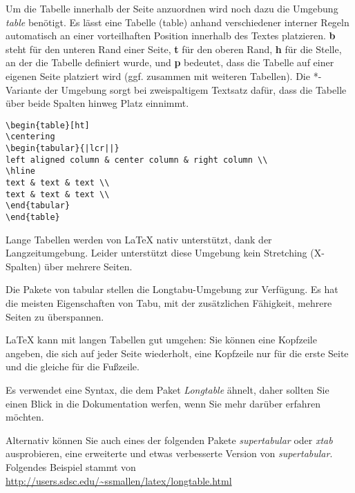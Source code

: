 \bigskip

Um die Tabelle innerhalb der Seite anzuordnen wird noch dazu die Umgebung \emph{table} benötigt. Es lässt eine Tabelle (table) anhand verschiedener interner Regeln automatisch an einer vorteilhaften Position innerhalb des Textes platzieren. \textbf{b} steht für den unteren Rand einer Seite, \textbf{t} für den oberen Rand, \textbf{h} für die Stelle, an der die Tabelle definiert wurde, und \textbf{p} bedeutet, dass die Tabelle auf einer eigenen Seite platziert wird (ggf. zusammen mit weiteren Tabellen). Die *-Variante der Umgebung sorgt bei zweispaltigem Textsatz dafür, dass die Tabelle über beide Spalten hinweg Platz einnimmt.

\begin{lstlisting}[style=LaTeX,caption={Einfache Tabelle mit Umgebung table},label=lst:tab3]
\begin{table}[ht]
\centering
\begin{tabular}{|lcr||}
left aligned column & center column & right column \\
\hline
text & text & text \\
text & text & text \\
\end{tabular}
\end{table}
\end{lstlisting}

Lange Tabellen werden von LaTeX nativ unterstützt, dank der Langzeitumgebung. Leider unterstützt diese Umgebung kein Stretching (X-Spalten) über mehrere Seiten.

Die Pakete von tabular stellen die Longtabu-Umgebung zur Verfügung. Es hat die meisten Eigenschaften von Tabu, mit der zusätzlichen Fähigkeit, mehrere Seiten zu überspannen.

LaTeX kann mit langen Tabellen gut umgehen: Sie können eine Kopfzeile angeben, die sich auf jeder Seite wiederholt, eine Kopfzeile nur für die erste Seite und die gleiche für die Fußzeile.

Es verwendet eine Syntax, die dem Paket \emph{Longtable} ähnelt, daher sollten Sie einen Blick in die Dokumentation werfen, wenn Sie mehr darüber erfahren möchten.

Alternativ können Sie auch eines der folgenden Pakete \emph{supertabular} oder \emph{xtab} ausprobieren, eine erweiterte und etwas verbesserte Version von \emph{supertabular}.
Folgendes Beispiel stammt von \url{http://users.sdsc.edu/~ssmallen/latex/longtable.html}

